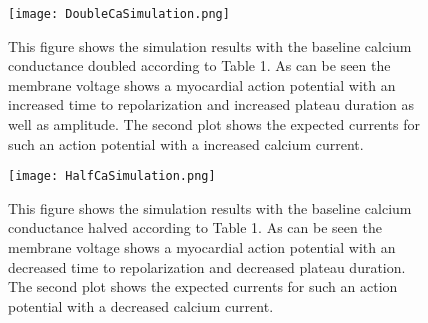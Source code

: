 \documentclass[12pt]{article}
\begin{document}
\begin{figure}[H]
	\centering
	\centering
	\texttt{[image: DoubleCaSimulation.png]}
	
	\caption{This figure shows the simulation results with the baseline calcium conductance doubled according to Table 1. As can be seen the membrane voltage shows a myocardial action potential with an increased time to repolarization and increased plateau duration as well as amplitude. The second plot shows the expected currents for such an action potential with a increased calcium current. }
	\label{fig:doubleCa}
\end{figure}
\begin{figure}[H]
	\centering
	\centering
	\texttt{[image: HalfCaSimulation.png]}
	
	\caption{This figure shows the simulation results with the baseline calcium conductance halved according to Table 1. As can be seen the membrane voltage shows a myocardial action potential with an decreased time to repolarization and decreased plateau duration. The second plot shows the expected currents for such an action potential with a decreased calcium current. }
	\label{fig:halfCa}
\end{figure}
\end{document}
